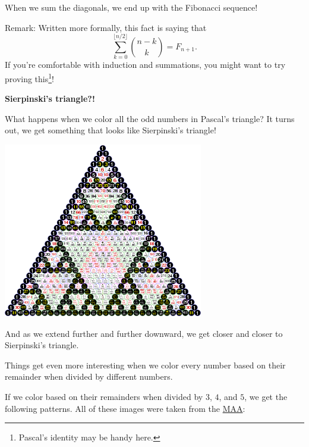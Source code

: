 \documentclass{article}
\begin{document}
When we sum the diagonals, we end up with the Fibonacci sequence! 

Remark: Written more formally, this fact is saying that
\[\sum_{k=0}^{\lfloor n/2\rfloor}\binom{n-k}k=F_{n+1}.\]
If you're comfortable with induction and summations, you might want to try proving this\footnote{Pascal's identity may be handy here.}!


\textbf{Sierpinski's triangle?!}

What happens when we color all the odd numbers in Pascal's triangle? It turns out, we get something that looks like Sierpinski's triangle! 

\begin{center}
	\includegraphics[scale=0.45]{images/pascal2.png}
\end{center}

And as we extend further and further downward, we get closer and closer to Sierpinski's triangle.

Things get even more interesting when we color every number based on their remainder when divided by different numbers. 

If we color based on their remainders when divided by $3$, $4$, and $5$, we get the following patterns. All of these images were taken from the \href{https://www.maa.org/press/periodicals/loci/joma/patterns-in-pascals-triangle-with-a-twist-first-twist-what-is-it}{MAA}:
\end{document}
